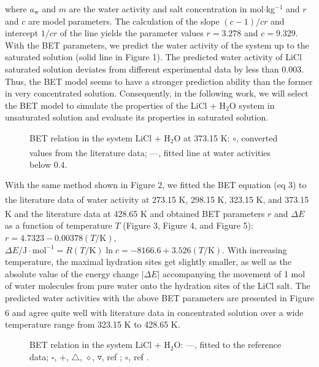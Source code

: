 \documentclass[11pt]{article}
\newcommand{\rc}[1]{\textsuperscript{\citenum{#1}}}
\begin{document}
where $a_{\mathrm{w}}$ and $m$ are the water activity and salt concentration
in mol$\cdot$kg$^{-1}$ and $r$ and $c$ are model parameters. The calculation
of the slope $(c - 1)/cr$ and intercept $1/cr$ of the line yields the
parameter values $r = 3.278$ and $c = 9.329$. With the BET parameters, we
predict the water activity of the system up to the saturated solution (solid
line in Figure 1). The predicted water activity of LiCl saturated solution
deviates from different experimental data by less than 0.003. Thus, the BET
model seems to have a stronger prediction ability than the former in very
concentrated solution. Consequently, in the following work, we will select the
BET model to simulate the properties of the LiCl + H$_2$O system in
unsaturated solution and evaluate its properties in saturated solution.

\begin{figure}[htbp]
\centering
\caption{BET relation in the system LiCl + H$_2$O at 373.15 K: $\circ$,
converted values from the literature data;\rc{ref24} ---, fitted line at water
activities below 0.4.}
\end{figure}

With the same method shown in Figure 2, we fitted the BET equation (eq 3) to
the literature data\rc{ref24} of water activity at 273.15 K, 298.15 K,
323.15 K, and 373.15 K and the literature data\rc{ref31} at 428.65 K and
obtained BET parameters $r$ and $\Delta E$ as a function of temperature $T$
(Figure 3, Figure 4, and Figure 5): $r = 4.7323 - 0.00378(T/\mathrm{K})$,
$\Delta E/\mathrm{J}\cdot\mathrm{mol}^{-1} = R(T/\mathrm{K}) \ln c =
-8166.6 + 3.526(T/\mathrm{K})$. With increasing temperature, the maximal
hydration sites get slightly smaller, as well as the absolute value of the
energy change $|\Delta E|$ accompanying the movement of 1 mol of water
molecules from pure water onto the hydration sites of the LiCl salt. The
predicted water activities with the above BET parameters are presented in
Figure 6 and agree quite well with literature
data\rc{ref3,ref4,ref9,ref24,ref31} in concentrated solution over a wide
temperature range from 323.15 K to 428.65 K.

\begin{figure}[htbp]
\centering
\caption{BET relation in the system LiCl + H$_2$O: ---, fitted to the
reference data; $\square$, $+$, $\triangle$, $\diamond$, $\triangledown$,
ref ; $\circ$, ref .}
\end{figure}
\end{document}
